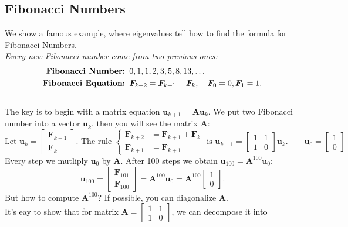 \subsection{Fibonacci Numbers}
We show a famous example, where eigenvalues tell how to find the formula for Fibonacci Numbers.\\
\emph{Every new Fibonacci number come from two previous ones:}
\begin{align*}
\text{\textbf{Fibonacci Number: }}&0,1,1,2,3,5,8,13,\dots\\
\text{\textbf{Fibonacci Equation: }}&\bm F_{k+2}=\bm F_{k+1}+\bm F_{k},\quad\bm F_0=0,\bm F_1=1.
\end{align*}
\\
The key is to begin with a matrix equation $\bm u_{k+1}=\bm A\bm u_k$. We put two Fibonacci number into a vector $\bm u_k$, then you will see the matrix $\bm A$:
\[
\text{Let }\bm u_k=\begin{bmatrix}
\bm F_{k+1}\\\bm F_k
\end{bmatrix}.\text{ The rule }\left\{
\begin{aligned}
\bm F_{k+2}&=\bm F_{k+1}+\bm F_{k}\\\bm F_{k+1}&=\bm F_{k+1}
\end{aligned}\right.\text{ is }\bm u_{k+1}=\begin{bmatrix}
1&1\\1&0
\end{bmatrix}\bm u_{k}.\qquad
\bm u_0=\begin{bmatrix}
1\\0
\end{bmatrix}
\]
Every step we mutliply $\bm u_0$ by $\bm A$. After 100 steps we obtain $\bm u_{100}=\bm A^{100}\bm u_0$:
\[
\bm u_{100}=\begin{bmatrix}
\bm F_{101}\\\bm F_{100}
\end{bmatrix}=\bm A^{100}\bm u_0=\bm A^{100}\begin{bmatrix}
1\\0
\end{bmatrix}.
\]
But how to compute $\bm A^{100}$? If possible, you can diagonalize $\bm A$.\\ It's eay to show that for matrix $\bm A=\begin{bmatrix}
1&1\\1&0
\end{bmatrix}$, we can decompose it into

